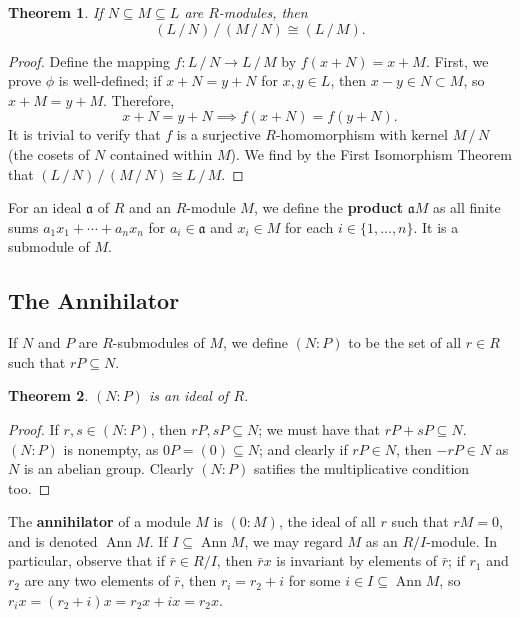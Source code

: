 \documentclass[11pt]{article}
\newtheorem{theorem}{Theorem}
\newcommand{\Ann}{\operatorname{Ann}}
\begin{document}
\begin{adjustwidth}{1cm}{}
	\begin{theorem}
		If $N \subseteq M \subseteq L$ are $R$-modules, then
		\[
			(L \,/\, N) \,/\, (M \,/\, N) \cong (L \,/\, M).
		\]
	\end{theorem}
	\begin{proof}
		Define the mapping $f : L \,/\, N \to L \,/\, M$ by $f(x + N) = x + M$. First, we prove $\phi$ is well-defined; if $x + N = y + N$ for $x, y \in L$, then $x - y \in N \subset M$, so $x + M = y + M$. Therefore,
		\[
			x + N = y + N \implies f(x + N) = f(y + N).
		\]
		It is trivial to verify that $f$ is a surjective $R$-homomorphism with kernel $M \,/\, N$ (the cosets of $N$ contained within $M$). We find by the First Isomorphism Theorem that $(L \,/\, N) \,/\, (M \,/\, N) \cong L \,/\, M$.
	\end{proof}
\end{adjustwidth}

For an ideal $\mathfrak{a}$ of $R$ and an $R$-module $M$, we define the \textbf{product} $\mathfrak{a} M$ as all finite sums $a_{1}x_{1} + \cdots + a_{n}x_{n}$ for $a_{i} \in \mathfrak{a}$ and $x_{i} \in M$  for each $i \in \{ 1, \ldots, n \}$. It is a submodule of $M$.


\subsection{The Annihilator}

If $N$ and $P$ are $R$-submodules of $M$, we define $(N : P)$ to be the set of all $r \in R$ such that $rP \subseteq N$.

\begin{adjustwidth}{1cm}{}
	\begin{theorem}
		$(N : P)$ is an ideal of $R$.
	\end{theorem}
	\begin{proof}
		If $r, s \in (N : P)$, then $rP, sP \subseteq N$; we must have that $rP + sP \subseteq N$. $(N : P)$ is nonempty, as $0P = (0) \subseteq N$; and clearly if $rP \in N$, then $-rP \in N$ as $N$ is an abelian group. Clearly $(N : P)$ satifies the multiplicative condition too.
	\end{proof}
\end{adjustwidth}

The \textbf{annihilator} of a module $M$ is $(0 : M)$, the ideal of all $r$ such that $rM = 0$, and is denoted $\Ann M$. If $I \subseteq \Ann M$, we may regard $M$ as an $R / I$-module. In particular, observe that if $\bar{r} \in R / I$, then $\bar{r}x$ is invariant by elements of $\bar{r}$; if $r_{1}$ and $r_{2}$ are any two elements of $\bar{r}$, then $r_{i} = r_{2} + i$ for some $i \in I \subseteq \Ann M$, so $r_{i}x = (r_{2} + i)x = r_{2}x + ix = r_{2}x$.
\end{document}
